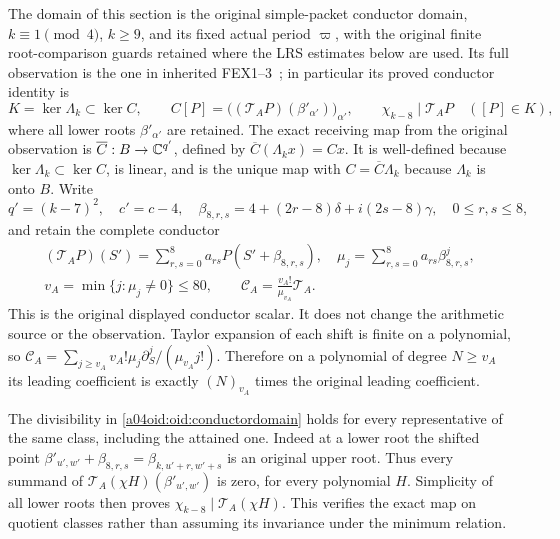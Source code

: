 \documentclass[11pt,a4paper]{article}
\begin{document}
The domain of this section is the original simple-packet conductor
domain, $k\equiv1\pmod4$, $k\ge9$, and its fixed actual period
$\varpi$, with the original finite root-comparison guards retained
where the LRS estimates below are used. Its full observation is the
one in inherited FEX1--3~\cite{a04oid:InheritedFEX}; in particular its
proved conductor identity is
\begin{equation}\label{a04oid:oid:conductordomain}
 K=\ker\Lambda_k\subset\ker C,
 \qquad C[P]=\bigl((\mathcal T_AP)(\beta'_{\alpha'})\bigr)_{\alpha'},
 \qquad \chi_{k-8}\mid\mathcal T_AP\quad([P]\in K),
\end{equation}
where all lower roots $\beta'_{\alpha'}$ are retained.
The exact receiving map from the original observation is
$\overline C:B\to\mathbb C^{q'}$, defined by
$\overline C(\Lambda_kx)=Cx$. It is well-defined because
$\ker\Lambda_k\subset\ker C$, is linear, and is the unique map
with $C=\overline C\Lambda_k$ because $\Lambda_k$ is onto $B$.
Write
\[
 q'=(k-7)^2,\quad c'=c-4,\quad
 \beta_{8,r,s}=4+(2r-8)\delta+i(2s-8)\gamma,
 \quad 0\le r,s\le8,
\]
and retain the complete conductor
\begin{equation}\label{a04oid:oid:conductoroperator}
 \begin{gathered}
 (\mathcal T_AP)(S')=\sum_{r,s=0}^8a_{rs}P(S'+\beta_{8,r,s}),
 \quad \mu_j=\sum_{r,s=0}^8a_{rs}\beta_{8,r,s}^j,\\
 v_A=\min\{j:\mu_j\ne0\}\le80,
 \qquad \mathcal C_A=\frac{v_A!}{\mu_{v_A}}\mathcal T_A.
 \end{gathered}
\end{equation}
This is the original displayed conductor scalar. It does not change
the arithmetic source or the observation. Taylor expansion of each
shift is finite on a polynomial, so
$\mathcal C_A=\sum_{j\ge v_A}v_A!\mu_j
\partial_S^j/(\mu_{v_A}j!)$. Therefore on a polynomial of degree
$N\ge v_A$ its leading coefficient is exactly $(N)_{v_A}$ times
the original leading coefficient.

The divisibility in \eqref{a04oid:oid:conductordomain} holds for every
representative of the same class, including the attained one.
Indeed at a lower root the shifted point
$\beta'_{u',w'}+\beta_{8,r,s}=\beta_{k,u'+r,w'+s}$ is an original
upper root. Thus every summand of
$\mathcal T_A(\chi H)(\beta'_{u',w'})$ is zero, for every polynomial
$H$. Simplicity of all lower roots then proves
$\chi_{k-8}\mid\mathcal T_A(\chi H)$. This verifies the exact map
on quotient classes rather than assuming its invariance under the
minimum relation.
\end{document}
